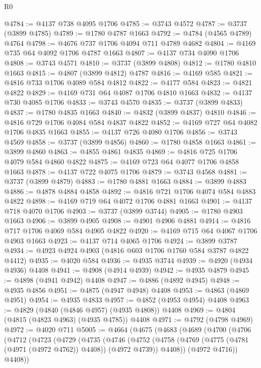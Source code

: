 \begin{lexlean}{R0}
\begin{coremodule}
@4784 := @4137 @738 @4095 @1706
@4785 := @3743 @4572
@4787 := @3737 (@3899 @4785)
@4789 := @1780 @4787 @1663
@4792 := @4784 (@4565 @4789) @4764
@4798 := @4676 @737 @1706 @4094 @711 @4789 @4682
@4804 := @4169 @735 @64 @4092 @1706 @4787 @1663
@4807 := @4137 @734 @4090 @1706
@4808 := @3743 @4571
@4810 := @3737 (@3899 @4808)
@4812 := @1780 @4810 @1663
@4815 := @4807 (@3899 @4812) @4787
@4816 := @4169 @585
@4821 := @4816 @733 @1706 @4089 @584 @4812
@4822 := @4177 @584
@4823 := @4821 @4822
@4829 := @4169 @731 @64 @4087 @1706 @4810 @1663
@4832 := @4137 @730 @4085 @1706
@4833 := @3743 @4570
@4835 := @3737 (@3899 @4833)
@4837 := @1780 @4835 @1663
@4840 := @4832 (@3899 @4837) @4810
@4846 := @4816 @729 @1706 @4084 @584 @4837 @4822
@4852 := @4169 @727 @64 @4082 @1706 @4835 @1663
@4855 := @4137 @726 @4080 @1706
@4856 := @3743 @4569
@4858 := @3737 (@3899 @4856)
@4860 := @1780 @4858 @1663
@4861 := @3899 @4860
@4863 := @4855 @4861 @4835
@4869 := @4816 @725 @1706 @4079 @584 @4860 @4822
@4875 := @4169 @723 @64 @4077 @1706 @4858 @1663
@4878 := @4137 @722 @4075 @1706
@4879 := @3743 @4568
@4881 := @3737 (@3899 @4879)
@4883 := @1780 @4881 @1663
@4884 := @3899 @4883
@4886 := @4878 @4884 @4858
@4892 := @4816 @721 @1706 @4074 @584 @4883 @4822
@4898 := @4169 @719 @64 @4072 @1706 @4881 @1663
@4901 := @4137 @718 @4070 @1706
@4903 := @3737 (@3899 @3744)
@4905 := @1780 @4903 @1663
@4906 := @3899 @4905
@4908 := @4901 @4906 @4881
@4914 := @4816 @717 @1706 @4069 @584 @4905 @4822
@4920 := @4169 @715 @64 @4067 @1706 @4903 @1663
@4923 := @4137 @714 @4065 @1706
@4924 := @3899 @3787
@4934 := @4923 @4924 @4903 (@4816 @603 @1706 @1760 @584 @3787 @4822 @4412)
@4935 := @4020 @584
@4936 := @4935 @3744
@4939 := @4920 (@4934 @4936) @4408
@4941 := @4908 (@4914 @4939)
@4942 := @4935 @4879
@4945 := @4898 (@4941 @4942) @4408
@4947 := @4886 (@4892 @4945)
@4948 := @4935 @4856
@4951 := @4875 (@4947 @4948) @4408
@4953 := @4863 (@4869 @4951)
@4954 := @4935 @4833
@4957 := @4852 (@4953 @4954) @4408
@4963 := @4829 (@4840 (@4846 @4957) (@4935 @4808)) @4408
@4969 := @4804 (@4815 (@4823 @4963) (@4935 @4785)) @4408
@4971 := @4792 (@4798 @4969)
@4972 := @4020 @711
@5005 := @4664
    (@4675
      (@4683
        (@4689
          (@4700
            (@4706
              (@4712
                (@4723
                  (@4729
                    (@4735
                      (@4746
                        (@4752
                          (@4758
                            (@4769 (@4775 (@4781 (@4971 (@4972 @4762)) @4408)) (@4972 @4739))
                            @4408))
                        (@4972 @4716))
                      @4408))

\end{coremodule}
\end{lexlean}
